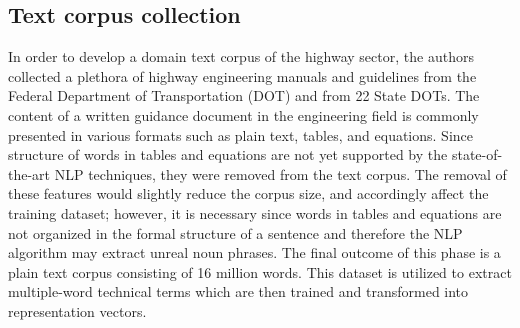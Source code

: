 \documentclass[Journal,InsideFigs, DoubleSpace]{ascelike} %
\begin{document}
\subsection{Text corpus collection}
In order to develop a domain text corpus of the highway sector, the authors collected a plethora of highway engineering manuals and guidelines from the Federal Department of Transportation (DOT) and from 22 State DOTs. The content of a written guidance document in the engineering field is commonly presented in various formats such as plain text, tables, and equations. Since structure of words in tables and equations are not yet supported by the state-of-the-art NLP techniques, they were removed from the text corpus. The removal of these features would slightly reduce the corpus size, and accordingly affect the training dataset; however, it is necessary since words in tables and equations are not organized in the formal structure of a sentence and therefore the NLP algorithm may extract unreal noun phrases. The final outcome of this phase is a plain text corpus consisting of 16 million words. This dataset is utilized to extract multiple-word technical terms which are then trained and transformed into representation vectors.
%
\end{document}
